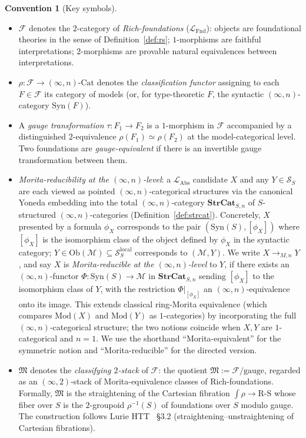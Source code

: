 \documentclass[11pt]{article}
\theoremstyle{plain}
\theoremstyle{definition}
\newtheorem{convention}[theorem]{Convention}
\newcommand{\cS}{\mathcal{S}}
\newcommand{\cF}{\mathcal{F}}
\newcommand{\cM}{\mathcal{M}}
\newcommand{\fM}{\mathfrak{M}}
\newcommand{\LFnd}{\mathcal{L}_{\mathrm{Fnd}}}
\newcommand{\LAbs}{\mathcal{L}_{\mathrm{Abs}}}
\newcommand{\Ob}{\mathrm{Ob}}
\newcommand{\Cat}{\mathrm{Cat}}
\newcommand{\Syn}{\mathrm{Syn}}
\newcommand{\Mod}{\mathrm{Mod}}
\begin{document}
\begin{convention}[Key symbols]\label{conv:notation}
\begin{itemize}
\item $\cF$ denotes the $2$-category of \emph{Rich-foundations} ($\LFnd$): objects are foundational theories in the sense of Definition~\ref{def:rs}; $1$-morphisms are faithful interpretations; $2$-morphisms are provable natural equivalences between interpretations.
\item $\rho : \cF \to (\infty, n)\text{-}\Cat$ denotes the \emph{classification functor} assigning to each $F \in \cF$ its category of models (or, for type-theoretic $F$, the syntactic $(\infty, n)$-category $\Syn(F)$).
\item A \emph{gauge transformation} $\tau : F_1 \to F_2$ is a $1$-morphism in $\cF$ accompanied by a distinguished $2$-equivalence $\rho(F_1) \simeq \rho(F_2)$ at the model-categorical level. Two foundations are \emph{gauge-equivalent} if there is an invertible gauge transformation between them.
\item \emph{Morita-reducibility at the $(\infty, n)$-level}: a $\LAbs$ candidate $X$ and any $Y \in \cS_S$ are each viewed as pointed $(\infty, n)$-categorical structures via the canonical Yoneda embedding into the total $(\infty, n)$-category $\mathbf{StrCat}_{S, n}$ of $S$-structured $(\infty, n)$-categories (Definition~\ref{def:strcat}). Concretely, $X$ presented by a formula $\phi_X$ corresponds to the pair $(\Syn(S), [\phi_X])$ where $[\phi_X]$ is the isomorphism class of the object defined by $\phi_X$ in the syntactic category; $Y \in \Ob(\cM) \subseteq \cS_S^{\mathrm{local}}$ corresponds to $(\cM, Y)$. We write $X \to_{M, n} Y$, and say $X$ is \emph{Morita-reducible at the $(\infty, n)$-level} to $Y$, if there exists an $(\infty, n)$-functor $\Phi : \Syn(S) \to \cM$ in $\mathbf{StrCat}_{S, n}$ sending $[\phi_X]$ to the isomorphism class of $Y$, with the restriction $\Phi |_{[\phi_X]}$ an $(\infty, n)$-equivalence onto its image. This extends classical ring-Morita equivalence (which compares $\Mod(X)$ and $\Mod(Y)$ as $1$-categories) by incorporating the full $(\infty, n)$-categorical structure; the two notions coincide when $X, Y$ are $1$-categorical and $n = 1$. We use the shorthand ``Morita-equivalent'' for the symmetric notion and ``Morita-reducible'' for the directed version.
\item $\fM$ denotes the \emph{classifying $2$-stack} of $\cF$: the quotient $\fM := \cF / \text{gauge}$, regarded as an $(\infty, 2)$-stack of Morita-equivalence classes of Rich-foundations. Formally, $\fM$ is the straightening of the Cartesian fibration $\int \rho \to \mathrm{R\text{-}S}$ whose fiber over $S$ is the $2$-groupoid $\rho^{-1}(S)$ of foundations over $S$ modulo gauge. The construction follows Lurie HTT~\cite{LurieHTT} \S 3.2 (straightening--unstraightening of Cartesian fibrations).

\end{itemize}
\end{convention}
\end{document}
